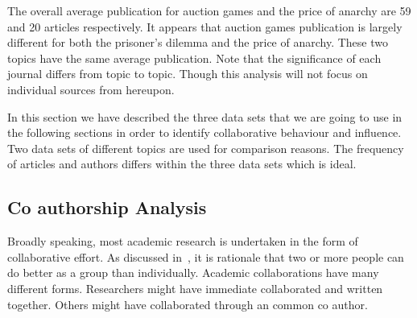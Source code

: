 \documentclass{article}
\theoremstyle{definition}
\begin{document}
The overall average publication for auction games and the price of anarchy are 59 and 20 articles
respectively. It appears that auction games publication is largely different
for both the prisoner's dilemma and the price of anarchy. These two topics have
the same average publication. Note that the significance of each journal differs
from topic to topic. Though this analysis will not focus on individual sources
from hereupon.



%     

In this section we have described the three data sets that we are going to use
in the following sections in order to identify collaborative behaviour and influence.
Two data sets of different topics are used for comparison reasons. The frequency of
articles and authors differs within the three data sets which is ideal.


\subsection{Co authorship Analysis}\label{section:co_authorship_analysis}

Broadly speaking, most academic research is undertaken in the form of
collaborative effort. As discussed in~\cite{Kyvik2017}, it is rationale that two
or more people can do better as a group than individually. Academic collaborations
have many different forms. Researchers might have immediate collaborated and
written together. Others might have collaborated through an common co author.
\end{document}
